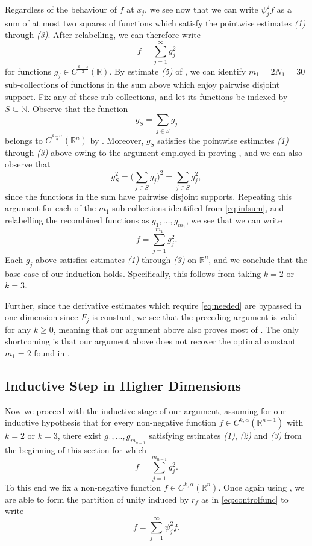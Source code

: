 \documentclass[oneside,hidelinks,indentfirst,10pt]{book}
\begin{document}
Regardless of the behaviour of \(f\) at \(x_j\), we see now that we can write \(\psi_j^2f\) as a sum of at most two squares of functions which satisfy the pointwise estimates \textit{(1)} through \textit{(3)}. After relabelling, we can therefore write
\begin{equation}\label{eq:infsum}
    f=\sum_{j=1}^\infty g_j^2
\end{equation}
for functions \(g_j\in C^\frac{k+\alpha}{2}(\mathbb{R})\). By estimate \textit{(5)} of , we can identify \(m_1=2N_{1}=30\) sub-collections of functions in the sum above which enjoy pairwise disjoint support. Fix any of these sub-collections, and let its functions be indexed by \(S\subseteq\mathbb{N}\). Observe that the function 
\begin{equation}\label{eq:recombsum}
    g_S=\sum_{j\in S}g_j
\end{equation}
belongs to \(C^\frac{k+\alpha}{2}(\mathbb{R}^n)\) by . Moreover, \(g_S\) satisfies the pointwise estimates \textit{(1)} through \textit{(3)} above owing to the argument employed in proving , and we can also observe that
\[
    g_S^2=\bigg(\sum_{j\in S}g_j\bigg)^2=\sum_{j\in S}g_j^2,
\]
since the functions in the sum have pairwise disjoint supports. Repeating this argument for each of the \(m_1\) sub-collections identified from \eqref{eq:infsum}, and relabelling the recombined functions as \(g_1,\dots,g_{m_1}\), we see that we can write
\[
    f=\sum_{j=1}^{m_1}g_j^2.
\]
Each \(g_j\) above satisfies estimates \textit{(1)} through \textit{(3)} on \(\mathbb{R}^n\), and we conclude that the base case of our induction holds. Specifically, this follows from taking \(k=2\) or \(k=3\).  


Further, since the derivative estimates which require \eqref{eq:needed} are bypassed in one dimension since \(F_j\) is constant, we see that the preceding argument is valid for any \(k\geq 0\), meaning that our argument above also proves most of . The only shortcoming is that our argument above does not recover the optimal constant \(m_1=2\) found in \cite{Bony}.

\medskip

\subsection*{\normalsize Inductive Step in Higher Dimensions}


Now we proceed with the inductive stage of our argument, assuming for our inductive hypothesis that for every non-negative function \(f\in C^{k,\alpha}(\mathbb{R}^{n-1})\) with \(k=2\) or \(k=3\), there exist \(g_1,\dots,g_{m_{n-1}}\) satisfying estimates \textit{(1)}, \textit{(2)} and \textit{(3)} from the beginning of this section for which
\[
    f=\sum_{j=1}^{m_{n-1}}g_j^2.
\]
To this end we fix a non-negative function \(f\in C^{k,\alpha}(\mathbb{R}^n)\). Once again using , we are able to form the partition of unity induced by \(r_f\) as in \eqref{eq:controlfunc} to write
\[
    f=\sum_{j=1}^\infty\psi_j^2f.
\]
\end{document}
